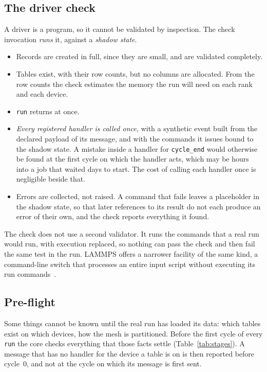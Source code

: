 \documentclass[11pt,a4paper]{article}
\newcommand{\code}[1]{\texttt{#1}}
\begin{document}
\subsection{The driver check}

A driver is a program, so it cannot be validated by inspection.  The check
invocation \emph{runs} it, against a \emph{shadow state}.

\begin{itemize}
  \item Records are created in full, since they are small, and are
        validated completely.
  \item Tables exist, with their row counts, but no columns are allocated.
        From the row counts the check estimates the memory the run will need
        on each rank and each device.
  \item \code{run} returns at once.
  \item \emph{Every registered handler is called once,} with a synthetic
        event built from the declared payload of its message, and with the
        commands it issues bound to the shadow state.  A mistake inside a
        handler for \code{cycle\_end} would otherwise be found at the first
        cycle on which the handler acts, which may be hours into a job that
        waited days to start.  The cost of calling each handler once is
        negligible beside that.
  \item Errors are collected, not raised.  A command that fails leaves a
        placeholder in the shadow state, so that later references to its
        result do not each produce an error of their own, and the check
        reports everything it found.
\end{itemize}

The check does not use a second validator.  It runs the commands that a
real run would run, with execution replaced, so nothing can pass the check
and then fail the same test in the run.  LAMMPS offers a narrower facility
of the same kind, a command-line switch that processes an entire input
script without executing its run commands~\cite{lammpsskiprun}.

\subsection{Pre-flight}
\label{sec:preflight}

Some things cannot be known until the real run has loaded its data: which
tables exist on which devices, how the mesh is partitioned.  Before the
first cycle of every \code{run} the core checks everything that those
facts settle (Table~\ref{tab:stages}).  A message that has no handler for
the device a table is on is then reported before cycle~0, and not at the
cycle on which its message is first sent.
\end{document}
